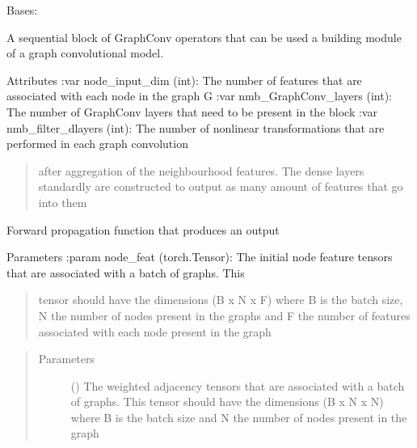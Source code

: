 \documentclass[letterpaper,10pt,english]{sphinxmanual}
\begin{document}
\begin{fulllineitems}
\label{\detokenize{modules/gqcml.nn:gqcml.nn.blocks.GraphConv_Block}}
Bases: 

A sequential block of GraphConv operators that can be used a building module of a graph convolutional model.

Attributes
:var node\_input\_dim (int): The number of features that are associated with each node in the graph G
:var nmb\_GraphConv\_layers (int): The number of GraphConv layers that need to be present in the block
:var nmb\_filter\_dlayers (int): The number of non\sphinxhyphen{}linear transformations that are performed in each graph convolution
\begin{quote}

after aggregation of the neighbourhood features. The dense layers standardly are constructed
to output as many amount of features that go into them
\end{quote}

\begin{fulllineitems}
\label{\detokenize{modules/gqcml.nn:gqcml.nn.blocks.GraphConv_Block.forward}}
Forward propagation function that produces an output

Parameters
:param node\_feat (torch.Tensor): The initial node feature tensors that are associated with a batch of graphs. This
\begin{quote}

tensor should have the dimensions (B x N x F) where B is the batch size, N the
number of nodes present in the graphs and F the number of features associated
with each node present in the graph
\end{quote}
\begin{quote}\begin{description}
\item[{Parameters}] \leavevmode
\sphinxstyleliteralstrong{\sphinxupquote{(}}\sphinxstyleliteralstrong{\sphinxupquote{)}} () \textendash{} The weighted adjacency tensors that are associated with a batch of graphs. This
tensor should have the dimensions (B x N x N) where B is the batch size and N
the number of nodes present in the graph


\end{description}
\end{quote}
\end{fulllineitems}
\end{fulllineitems}
\end{document}
